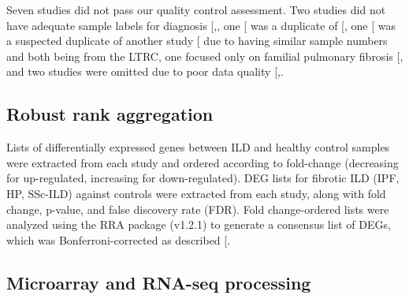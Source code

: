 \documentclass[
]{article}
\begin{document}
Seven studies did not pass our quality control assessment. Two studies did not have adequate sample labels for diagnosis {[},\citeproc{ref-zhu_integration_2018}{152}{]}, one {[}\citeproc{ref-christmann_association_2014}{126}{]} was a duplicate of {[}\citeproc{ref-christmann_mir-155_2016}{81}{]}, one {[}\citeproc{ref-ghosh_lung_2022}{153}{]} was a suspected duplicate of another study {[}\citeproc{ref-borie_colocalization_2022}{69}{]} due to having similar sample numbers and both being from the LTRC, one focused only on familial pulmonary fibrosis {[}\citeproc{ref-el-chemaly_immunome_2018}{154}{]}, and two studies were omitted due to poor data quality {[},\citeproc{ref-zhou_integrated_2019}{155}{]}.

\subsection{Robust rank aggregation}\label{robust-rank-aggregation}

Lists of differentially expressed genes between ILD and healthy control samples were extracted from each study and ordered according to fold-change (decreasing for up-regulated, increasing for down-regulated). DEG lists for fibrotic ILD (IPF, HP, SSc-ILD) against controls were extracted from each study, along with fold change, p-value, and false discovery rate (FDR). Fold change-ordered lists were analyzed using the RRA package (v1.2.1) to generate a consensus list of DEGs, which was Bonferroni-corrected as described {[}\citeproc{ref-vosa_comprehensive_2014}{156}{]}.

\subsection{Microarray and RNA-seq processing}\label{microarray-and-rna-seq-processing}
\end{document}
